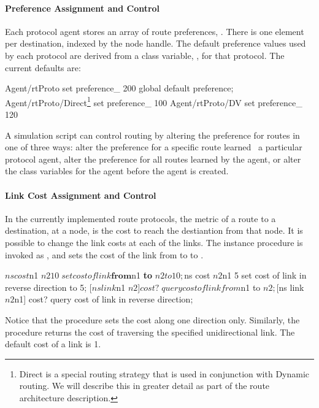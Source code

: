 \paragraph{Preference Assignment and Control}
Each protocol agent stores an array of route preferences, .
There is one element per destination, indexed by the node handle.
The default preference values used by each protocol are derived from
a class variable, , for that protocol.
The current defaults are:
\begin{program}
        Agent/rtProto set preference_ 200               \; global default preference;
        Agent/rtProto/Direct\footnote{Direct is a special routing strategy that is used in conjunction with Dynamic routing.  We will describe this in greater detail as part of the route architecture description.} set preference_ 100
        Agent/rtProto/DV set preference_ 120
\end{program}
A simulation script can control routing by altering the preference
for routes in one of three ways:
alter the preference 
for a specific route learned \via\ a particular protocol agent,
alter the preference for all routes learned by the agent, or
alter the class variables for the agent before the agent is created.

\paragraph{Link Cost Assignment and Control}
In the currently implemented route protocols,
the metric of a route to a destination, at a node,
is the cost to reach the destiantion from that node.
It is possible to change the link costs at each of the links.
The instance procedure
is invoked as ,
and sets the cost of the link from  to 
to .
\begin{program}
        $ns cost $n1 $n2 10        \; set cost of link \textbf{from} $n1 \textbf{to} $n2 to 10;
        $ns cost $n2 $n1  5        \; set cost of link in reverse direction to 5;
        [$ns link $n1 $n2] cost?   \; query cost of link from $n1 to $n2;
        [$ns link $n2 $n1] cost?   \; query cost of link in reverse direction;
\end{program}
Notice that the procedure sets the cost along one direction only.
Similarly, the procedure
returns the cost of traversing the specified unidirectional link.
The default cost of a link is 1.

